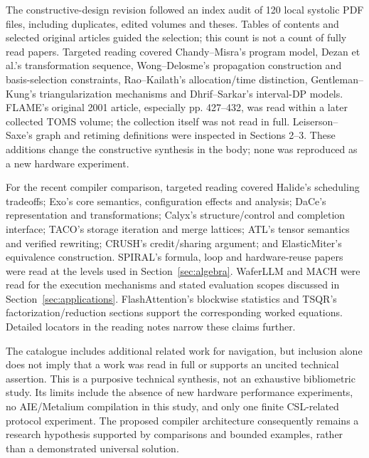 \documentclass[final,3p,times,authoryear]{elsarticle}
\begin{document}
The constructive-design revision followed an index audit of 120 local systolic PDF files, including duplicates, edited volumes and theses. Tables of contents and selected original articles guided the selection; this count is not a count of fully read papers. Targeted reading covered Chandy--Misra's program model, Dezan et al.'s transformation sequence, Wong--Delosme's propagation construction and basis-selection constraints, Rao--Kailath's allocation/time distinction, Gentleman--Kung's triangularization mechanisms and Dhrif--Sarkar's interval-DP models. FLAME's original 2001 article, especially pp. 427--432, was read within a later collected TOMS volume; the collection itself was not read in full. Leiserson--Saxe's graph and retiming definitions were inspected in Sections 2--3. These additions change the constructive synthesis in the body; none was reproduced as a new hardware experiment.

For the recent compiler comparison, targeted reading covered Halide's scheduling tradeoffs; Exo's core semantics, configuration effects and analysis; DaCe's representation and transformations; Calyx's structure/control and completion interface; TACO's storage iteration and merge lattices; ATL's tensor semantics and verified rewriting; CRUSH's credit/sharing argument; and ElasticMiter's equivalence construction. SPIRAL's formula, loop and hardware-reuse papers were read at the levels used in Section~\ref{sec:algebra}. WaferLLM and MACH were read for the execution mechanisms and stated evaluation scopes discussed in Section~\ref{sec:applications}. FlashAttention's blockwise statistics and TSQR's factorization/reduction sections support the corresponding worked equations. Detailed locators in the reading notes narrow these claims further.

The catalogue includes additional related work for navigation, but inclusion alone does not imply that a work was read in full or supports an uncited technical assertion. This is a purposive technical synthesis, not an exhaustive bibliometric study. Its limits include the absence of new hardware performance experiments, no AIE/Metalium compilation in this study, and only one finite CSL-related protocol experiment. The proposed compiler architecture consequently remains a research hypothesis supported by comparisons and bounded examples, rather than a demonstrated universal solution.
\end{document}
